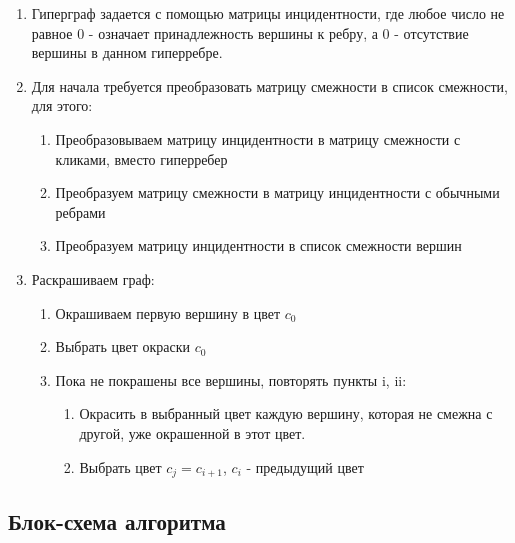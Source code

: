 \documentclass[a4paper, 12pt]{article}
\begin{document}
\begin{enumerate}
    \item Гиперграф задается с помощью матрицы инцидентности, где любое число не равное 0 - означает принадлежность вершины к ребру,
    а 0 - отсутствие вершины в данном гиперребре.
    \item Для начала требуется преобразовать матрицу смежности в список смежности, для этого:\begin{enumerate}
        \item Преобразовываем матрицу инцидентности в матрицу смежности с кликами, вместо гиперребер
        \item Преобразуем матрицу смежности в матрицу инцидентности с обычными ребрами
        \item Преобразуем матрицу инцидентности в список смежности вершин
    \end{enumerate}
    \item Раскрашиваем граф: \begin{enumerate}
        \item Окрашиваем первую вершину в цвет $c_0$
        \item Выбрать цвет окраски $c_0$
        \item Пока не покрашены все вершины, повторять пункты i, ii: \begin{enumerate}
            \item Окрасить в выбранный цвет каждую вершину, которая не смежна с другой, уже окрашенной в этот цвет.
            \item Выбрать цвет $c_j = c_{i+1}$, $c_i$ - предыдущий цвет
        \end{enumerate}
    \end{enumerate}
\end{enumerate}

\subsection{Блок-схема алгоритма}
\end{document}
